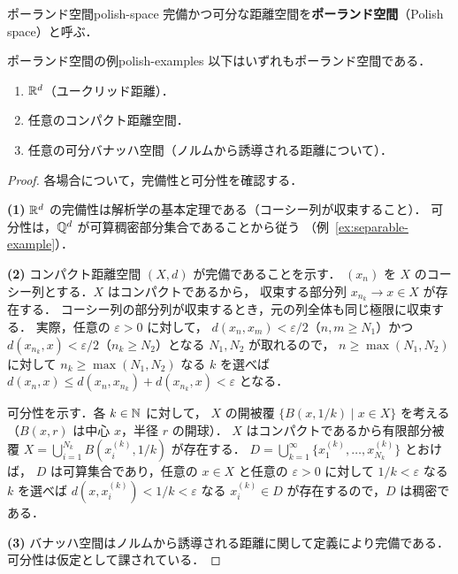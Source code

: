 \begin{definition}{ポーランド空間}{polish-space}
  完備かつ可分な距離空間を\textbf{ポーランド空間}（Polish space）と呼ぶ．
\end{definition}

\begin{proposition}{ポーランド空間の例}{polish-examples}
  以下はいずれもポーランド空間である．
  \begin{enumerate}
    \item $\mathbb{R}^d$（ユークリッド距離）．
    \item 任意のコンパクト距離空間．
    \item 任意の可分バナッハ空間（ノルムから誘導される距離について）．
  \end{enumerate}
\end{proposition}

\begin{proof}
  各場合について，完備性と可分性を確認する．

  \textbf{(1)}
  $\mathbb{R}^d$ の完備性は解析学の基本定理である（コーシー列が収束すること）．
  可分性は，$\mathbb{Q}^d$ が可算稠密部分集合であることから従う
  （例~\ref{ex:separable-example}）．

  \textbf{(2)}
  コンパクト距離空間 $(X, d)$ が完備であることを示す．
  $(x_n)$ を $X$ のコーシー列とする．$X$ はコンパクトであるから，
  収束する部分列 $x_{n_k} \to x \in X$ が存在する．
  コーシー列の部分列が収束するとき，元の列全体も同じ極限に収束する．
  実際，任意の $\varepsilon > 0$ に対して，
  $d(x_n, x_m) < \varepsilon/2$（$n, m \geq N_1$）かつ
  $d(x_{n_k}, x) < \varepsilon/2$（$n_k \geq N_2$）となる $N_1, N_2$ が取れるので，
  $n \geq \max(N_1, N_2)$ に対して $n_k \geq \max(N_1, N_2)$ なる $k$ を選べば
  $d(x_n, x) \leq d(x_n, x_{n_k}) + d(x_{n_k}, x) < \varepsilon$ となる．

  可分性を示す．各 $k \in \mathbb{N}$ に対して，
  $X$ の開被覆 $\{B(x, 1/k) \mid x \in X\}$ を考える
  （$B(x, r)$ は中心 $x$，半径 $r$ の開球）．
  $X$ はコンパクトであるから有限部分被覆
  $X = \bigcup_{i=1}^{N_k} B(x_i^{(k)}, 1/k)$ が存在する．
  $D = \bigcup_{k=1}^{\infty} \{x_1^{(k)}, \ldots, x_{N_k}^{(k)}\}$ とおけば，
  $D$ は可算集合であり，任意の $x \in X$ と任意の $\varepsilon > 0$ に対して
  $1/k < \varepsilon$ なる $k$ を選べば $d(x, x_i^{(k)}) < 1/k < \varepsilon$
  なる $x_i^{(k)} \in D$ が存在するので，$D$ は稠密である．

  \textbf{(3)}
  バナッハ空間はノルムから誘導される距離に関して定義により完備である．
  可分性は仮定として課されている．
\end{proof}

